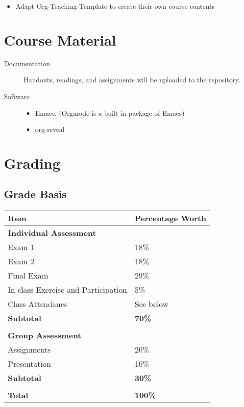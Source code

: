 \documentclass[article,letterpaper,times,10pt,listings-bw,microtype]{scrartcl}
\begin{document}
\begin{itemize}
\item Adapt Org-Teaching-Template to create their own course contents
\end{itemize}
\section*{Course Material}
\label{sec:orgd15e0a0}
\begin{description}
\item[{Documentation}] Handouts, readings, and assignments will be uploaded to
the repository.
\item[{Software}] \quad 

\begin{itemize}
\item Emacs. (Orgmode is a built-in package of Emacs)
\item org-reveal
\end{itemize}
\end{description}
\section*{Grading}
\label{sec:org392116e}

\subsection*{Grade Basis}
\label{sec:orgee8a995}
\begin{center}
\label{tab:org244e349}
\begin{tabular}{ll}
\hline
Item & Percentage Worth\\
\hline
\textbf{Individual Assessment} & \\
Exam 1 & 18\%\\
Exam 2 & 18\%\\
Final Exam & 29\%\\
In-class Exercise and Participation & 5\%\\
Class Attendance & See below\\
\textbf{Subtotal} & \textbf{70\%}\\
\hline
 & \\
\textbf{Group Assessment} & \\
Assignments & 20\%\\
Presentation & 10\%\\
\textbf{Subtotal} & \textbf{30\%}\\
\hline
 & \\
\textbf{Total} & \textbf{100\%}\\
\hline
\end{tabular}
\end{center}
\end{document}
